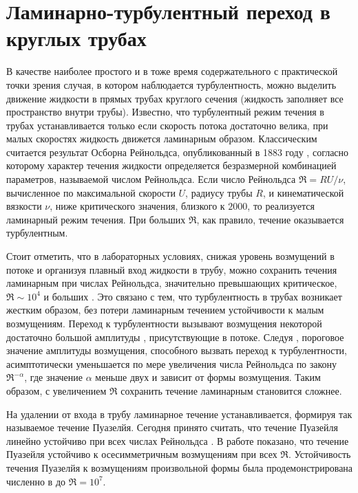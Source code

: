 \section{Ламинарно-турбулентный переход в круглых трубах}

В качестве наиболее простого и в тоже время содержательного с практической точки зрения случая, в котором наблюдается турбулентность, можно выделить движение жидкости в прямых трубах круглого сечения (жидкость заполняет все пространство внутри трубы). Известно, что турбулентный режим течения в трубах устанавливается только если скорость потока достаточно велика, при малых скоростях жидкость движется ламинарным образом. Классическим считается результат Осборна Рейнольдса, опубликованный в 1883 году \cite{Reynolds1883}, согласно которому характер течения жидкости определяется безразмерной комбинацией параметров, называемой числом Рейнольдса. Если число Рейнольдса $\Re = RU/\nu$, вычисленное по максимальной скорости $U$, радиусу трубы $R$, и кинематической вязкости $\nu$, ниже критического значения, близкого к $2000$, то реализуется ламинарный режим течения. При больших $\Re$, как правило, течение оказывается турбулентным. 

Стоит отметить, что в лабораторных условиях, снижая уровень возмущений в потоке и организуя плавный вход жидкости в трубу, можно сохранить течения ламинарным при числах Рейнольдса, значительно превышающих критическое, $\Re \sim 10^4$ и больших \cite{Wygnanski1973, Darbyshire1995, vanDoorne2009}. Это связано с тем, что турбулентность в трубах возникает жестким образом, без потери ламинарным течением устойчивости к малым возмущениям. Переход к турбулентности вызывают возмущения некоторой достаточно большой амплитуды \cite{Grossmann2000}, присутствующие в потоке. Следуя \cite{Darbyshire1995, Hof2003, Peixinho2007, Mellibovsky2009critical}, пороговое значение амплитуды возмущения, способного вызвать переход к турбулентности, асимптотически уменьшается по мере увеличения числа Рейнольдса по закону $\Re^{-\alpha}$, где значение $\alpha$ меньше двух и зависит от формы возмущения. Таким образом, с увеличением $\Re$ сохранить течение ламинарным становится сложнее. 

На удалении от входа в трубу ламинарное течение устанавливается, формируя так называемое течение Пуазелйя. Сегодня принято считать, что течение Пуазейля линейно устойчиво при всех числах Рейнольдса \cite{Kerswell2005}. В работе \cite{Salwen1980} показано, что течение Пуазейля устойчиво к осесимметричным возмущениям при всех $\Re$. Устойчивость течения Пуазелйя к возмущениям произвольной формы была продемонстрирована численно в \cite{Meseguer2003} до $\Re = 10^7$. 

